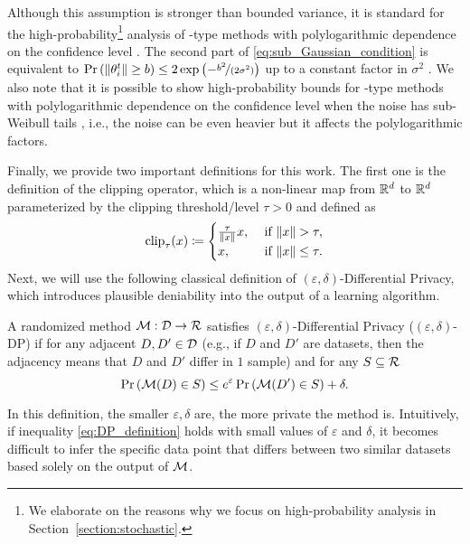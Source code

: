 \documentclass[a4paper,11pt]{article}
\begin{document}
Although this assumption is stronger than bounded variance, it is standard for the high-probability\footnote{We elaborate on the reasons why we focus on high-probability analysis in Section~\ref{section:stochastic}.} analysis of -type methods with polylogarithmic dependence on the confidence level \citep{nemirovski2009robust, ghadimi2012optimal}. The second part of \eqref{eq:sub_Gaussian_condition} is equivalent to $\Pr\left(\|\theta^t_i\| \ge b\right) \le 2\exp\left(-\nicefrac{b^2}{(2\sigma^2)}\right)$ up to a constant factor in $\sigma^2$ \citep{vershynin2018high}. We also note that it is possible to show high-probability bounds for -type methods with polylogarithmic dependence on the confidence level when the noise has sub-Weibull tails \citep{madden2024high}, i.e., the noise can be even heavier but it affects the polylogarithmic factors.

Finally, we provide two important definitions for this work. The first one is the definition of the clipping operator, which is a non-linear map from $\mathbb{R}^d$ to $\mathbb{R}^d$ parameterized by the clipping threshold/level $\tau > 0$ and defined as
\begin{equation}\label{eq:clipping_operator}
\operatorname{clip}_{\tau}(x) \coloneqq \begin{cases}
    \frac{\tau}{\|x\|}x, &\text{ if } \|x\| > \tau,\\
    x, &\text{ if } \|x\| \le \tau.
\end{cases}
\end{equation}
Next, we will use the following classical definition of $(\varepsilon,\delta)$-Differential Privacy, which introduces plausible deniability into the output of a learning algorithm.
\begin{definition}
   A randomized method $\mathcal M:\mathcal{D} \to \mathcal{R}$ satisfies $(\varepsilon,\delta)$-Differential Privacy ($(\varepsilon,\delta)$-DP) if for any adjacent $D, D' \in \mathcal{D}$ (e.g., if $D$ and $D'$ are datasets, then the adjacency means that $D$ and $D'$ differ in $1$ sample) and for any $S \subseteq \mathcal{R}$
   \begin{equation}
       \Pr\left(\mathcal M(D) \in S\right) \leq e^\varepsilon \Pr\left(\mathcal M(D') \in S\right) + \delta. \label{eq:DP_definition}
   \end{equation}
\end{definition}
In this definition, the smaller $\varepsilon, \delta$ are, the more private the method is. Intuitively, if inequality \eqref{eq:DP_definition} holds with small values of $\varepsilon$ and $\delta$, it becomes difficult to infer the specific data point that differs between two similar datasets based solely on the output of $\mathcal M$.
\end{document}
